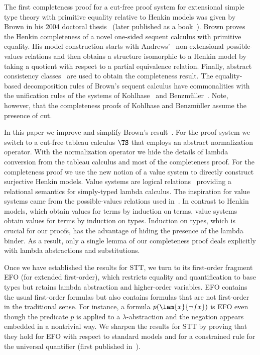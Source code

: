 The first completeness proof for a cut-free proof system
for extensional simple type theory with primitive equality
relative to Henkin models was given by
Brown in his 2004 doctoral thesis~\cite{Brown2004a}
(later published as a book~\cite{BrownARHO}).  Brown
proves the Henkin completeness of a novel one-sided
sequent calculus with primitive equality.  His model
construction starts with Andrews'~\cite{Andrews71}
non-extensional possible-values relations and then
obtains a structure isomorphic to a Henkin model by
taking a quotient with respect to a partial equivalence
relation.  Finally, abstract consistency
classes~\cite{SmullyanBook,Andrews71} are used to
obtain the completeness result.  The equality-based
decomposition rules of Brown's sequent calculus have
commonalities with the unification rules of the systems
of Kohlhase~\cite{KohlhaseTableaux1995} and
Benzm\"uller~\cite{Benzmuller99b}.  Note, however, that
the completeness proofs of Kohlhase and Benzm\"uller
assume the presence of cut.

In this paper we improve and simplify Brown's
result~\cite{BrownARHO}.  
For the proof system we
switch to a cut-free tableau calculus $\TS$ that employs an
abstract normalization operator.  With the
normalization operator we hide the details of lambda
conversion from the tableau calculus and most of the
completeness proof.  For the completeness proof we use
the new notion of a value system to directly construct
surjective Henkin models.  Value systems are logical
relations~\cite{Statman85a} providing a relational
semantics for simply-typed lambda calculus.  The
inspiration for value systems came from the
possible-values relations used
in~\cite{BrownARHO,BrownSmolkaBasic,BrownSmolkaEFO}.
In contrast to Henkin models, which obtain values for
terms by induction on terms, value systems obtain
values for terms by induction on types.  Induction on
types, which is crucial for our proofs, has the
advantage of hiding the presence of the lambda binder.
As a result, only a single lemma of our completeness
proof deals explicitly with lambda abstractions and
substitutions.

Once we have established the results for STT, we turn
to its first-order fragment EFO (for extended
first-order), which restricts equality and
quantification to base types but retains lambda
abstraction and higher-order variables.  EFO contains
the usual first-order formulas but also contains
formulas that are not first-order in the traditional
sense.  For instance, a formula $p(\lam{x}{\neg fx})$
is EFO even though the predicate $p$ is applied to a
$\lambda$-abstraction and the negation appears embedded
in a nontrivial way.  We sharpen the results for STT by
proving that they hold for EFO with respect to standard
models and for a constrained rule for the universal
quantifier (first published in~\cite{BrownSmolkaEFO}).

